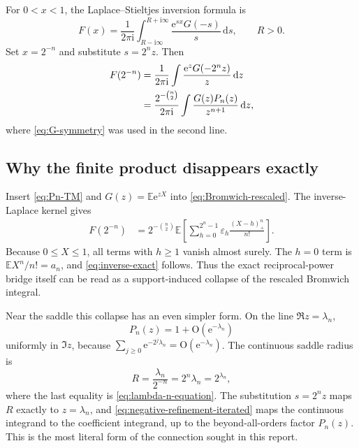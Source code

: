 \documentclass[11pt,oneside]{article}
\theoremstyle{definition}
\theoremstyle{remark}
\newcommand{\e}{\mathrm e}
\newcommand{\ii}{\mathrm i}
\newcommand{\dd}{\,\mathrm d}
\newcommand{\E}{\mathbb E}
\newcommand{\bigO}{\mathrm O}
\newcommand{\TM}{\varepsilon}
\begin{document}
For $0<x<1$, the Laplace--Stieltjes inversion formula is
\begin{equation}
 F(x)=\frac1{2\pi\ii}
 \int_{R-\ii\infty}^{R+\ii\infty}
 \frac{\e^{sx}G(-s)}s\dd s,
 \qquad R>0.
\label{eq:Bromwich-F}
\end{equation}
Set $x=2^{-n}$ and substitute $s=2^nz$.  Then
\begin{align}
 F(2^{-n})
 &=\frac1{2\pi\ii}\int
 \frac{\e^zG(-2^nz)}z\dd z                              \notag\\
 &=\frac{2^{-\binom n2}}{2\pi\ii}
 \int
 \frac{G(z)P_n(z)}{z^{n+1}}\dd z,
\label{eq:Bromwich-rescaled}
\end{align}
where \eqref{eq:G-symmetry} was used in the second line.

\subsection{Why the finite product disappears exactly}

Insert \eqref{eq:Pn-TM} and $G(z)=\E\e^{zX}$ into
\eqref{eq:Bromwich-rescaled}.  The inverse-Laplace kernel gives
\begin{align}
 F(2^{-n})
 &=2^{-\binom n2}
 \E\left[
 \sum_{h=0}^{2^n-1}\TM_h\frac{(X-h)_+^n}{n!}
 \right].
\label{eq:positive-part-collapse}
\end{align}
Because $0\le X\le1$, all terms with $h\ge1$ vanish almost surely.  The $h=0$ term is
$\E X^n/n!=a_n$, and \eqref{eq:inverse-exact} follows.  Thus the exact reciprocal-power bridge itself can be read as a support-induced collapse of the rescaled Bromwich integral.

Near the saddle this collapse has an even simpler form.  On the line $\Re z=\lambda_n$,
\begin{equation}
 P_n(z)=1+\bigO(\e^{-\lambda_n})
\label{eq:Pn-near-one}
\end{equation}
uniformly in $\Im z$, because
$\sum_{j\ge0}\e^{-2^j\lambda_n}=\bigO(\e^{-\lambda_n})$.
The continuous saddle radius is
\begin{equation}
 R=\frac{\lambda_n}{2^{-n}}=2^n\lambda_n=2^{\lambda_n},
\label{eq:continuous-vs-coeff-saddle}
\end{equation}
where the last equality is \eqref{eq:lambda-n-equation}.  The substitution
$s=2^nz$ maps $R$ exactly to $z=\lambda_n$, and
\eqref{eq:negative-refinement-iterated} maps the continuous integrand to the coefficient integrand, up to the beyond-all-orders factor $P_n(z)$.  This is the most literal form of the connection sought in this report.
\end{document}

